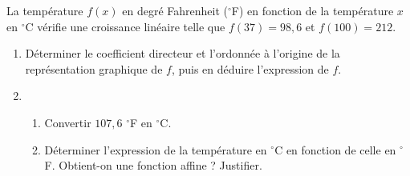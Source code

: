 \documentclass[11pt]{article}
\begin{document}
\begin{exo}
  La température $f(x)$ en degré Fahrenheit ($^\circ$F) en fonction de la
  température $x$ en $^\circ$C vérifie une croissance linéaire telle que
  $f(37)=98,6$ et $f(100)=212$.
  \begin{enumerate}
    \item Déterminer le coefficient directeur et l'ordonnée à l'origine de la
      représentation graphique de $f$, puis en déduire l'expression de $f$.
    \item \begin{enumerate}
        \item Convertir $107,6$ $^\circ$F en $^\circ$C.
        \item Déterminer l'expression de la température en $^\circ$C en fonction
          de celle en $^\circ$F. Obtient-on une fonction affine ? Justifier.
      \end{enumerate}
  \end{enumerate}
\end{exo}
\end{document}
